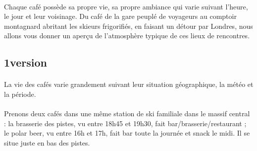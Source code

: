 \paragraph{}
Chaque café possède sa propre vie, sa propre ambiance qui varie suivant
l’heure, le jour et leur voisinage. Du café de la gare peuplé de voyageurs au
comptoir montagnard abritant les skieurs frigorifiés, en faisant un détour par
Londres, nous allons vous donner un aperçu de l’atmosphère typique de ces lieux
de rencontres.

\subsection{1\ier version}
\paragraph{}
La vie des cafés varie grandement suivant leur situation géographique, la météo
et la période.

\paragraph{}
Prenons deux cafés dans une même station de ski familiale dans le massif
central : la brasserie des pistes, vu entre 18h45 et 19h30, fait
bar/brasserie/restaurant ; le polar beer, vu entre 16h et 17h, fait bar toute
la journée et snack le midi. Il se situe juste en bas des pistes.

